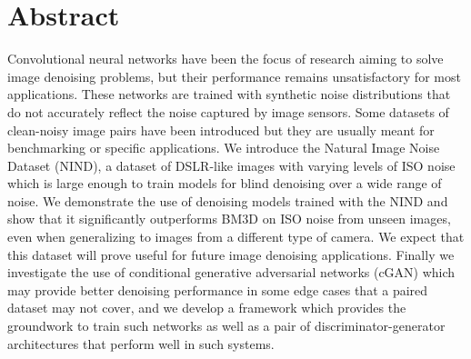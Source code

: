 \begingroup
\let\clearpage\relax
\let\cleardoublepage\relax
\let\cleardoublepage\relax

\chapter*{Abstract}


Convolutional neural networks have been the focus of research aiming to solve image denoising problems, but their performance remains unsatisfactory for most applications. These networks are trained with synthetic noise distributions that do not accurately reflect the noise captured by image sensors. Some datasets of clean-noisy image pairs have been introduced but they are usually meant for benchmarking or specific applications. We introduce the Natural Image Noise Dataset (NIND), a dataset of DSLR-like images with varying levels of ISO noise which is large enough to train models for blind denoising over a wide range of noise. We demonstrate the use of denoising models trained with the NIND and show that it significantly outperforms BM3D on ISO noise from unseen images, even when generalizing to images from a different type of camera. We expect that this dataset will prove useful for future image denoising applications. Finally we investigate the use of conditional generative adversarial networks (cGAN) which may provide better denoising performance in some edge cases that a paired dataset may not cover, and we develop a framework which provides the groundwork to train such networks as well as a pair of discriminator-generator architectures that perform well in such systems.


\vfill


\endgroup

\vfill
